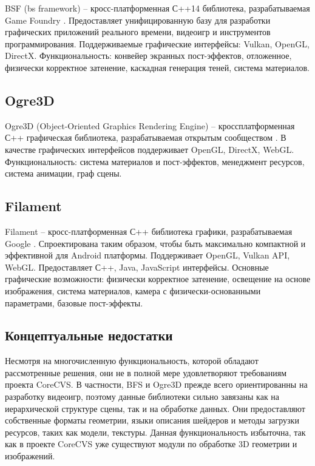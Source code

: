 \documentclass[14pt]{matmex-diploma}
\begin{document}
BSF (bs framework) -- кросс-платформенная С++14 библиотека, разрабатываемая Game Foundry \cite{github:bsf}. Предоставляет унифицированную базу для разработки графических приложений реального времени, видеоигр и инструментов программирования. Поддерживаемые графические интерфейсы: Vulkan, OpenGL, DirectX. Функциональность: конвейер экранных пост-эффектов, отложенное, физически корректное затенение, каскадная генерация теней, система материалов.

\subsection{Ogre3D}

Ogre3D (Object-Oriented Graphics Rendering Engine) -- кроссплатформенная С++ графическая библиотека, разрабатываемая открытым сообществом \cite{github:ogre3d}. В качестве графических интерфейсов поддерживает OpenGL, DirectX, WebGL. Функциональность: система материалов и пост-эффектов, менеджмент ресурсов, система анимации, граф сцены.  

\subsection{Filament}
    
Filament -- кросс-платформенная С++ библиотека графики, разрабатываемая Google \cite{github:filament}. Спроектирована таким образом, чтобы быть максимально компактной и эффективной для Android платформы. Поддерживает OpenGL, Vulkan API, WebGL. Предоставляет С++, Java, JavaScript интерфейсы. Основные графические возможности: физически корректное затенение, освещение на основе изображения, система материалов, камера с физически-основанными параметрами, базовые пост-эффекты. 

\subsection{Концептуальные недостатки}

Несмотря на многочисленную функциональность, которой обладают рассмотренные решения, они не в полной мере удовлетворяют требованиям проекта CoreCVS. В частности, BFS и Ogre3D прежде всего ориентированны на разработку видеоигр, поэтому данные библиотеки сильно завязаны как на иерархической структуре сцены, так и на обработке данных. Они предоставляют собственные форматы геометрии, языки описания шейдеров и методы загрузки ресурсов, таких как модели, текстуры. Данная функциональность избыточна, так как в проекте CoreCVS уже существуют модули по обработке 3D геометрии и изображений. 
\end{document}
